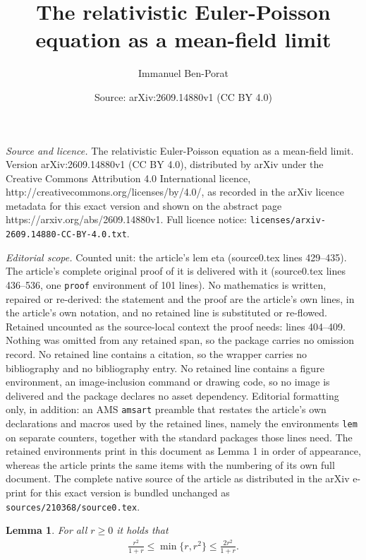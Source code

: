 \documentclass[10pt,a4paper]{amsart}
\title{The relativistic Euler-Poisson equation as a mean-field limit}
\author{Immanuel Ben-Porat}
\date{Source: arXiv:2609.14880v1 (CC BY 4.0)}
\newtheorem{lem}{Lemma}
\begin{document}
\maketitle

\noindent\emph{Source and licence.} The relativistic Euler-Poisson equation as a mean-field limit. Version arXiv:2609.14880v1 (CC BY 4.0), distributed by arXiv under the Creative Commons Attribution 4.0 International licence, http://creativecommons.org/licenses/by/4.0/, as recorded in the arXiv licence metadata for this exact version and shown on the abstract page https://arxiv.org/abs/2609.14880v1. Full licence notice: \texttt{licenses/arxiv-2609.14880-CC-BY-4.0.txt}.\par\smallskip

\noindent\textit{Editorial scope.} Counted unit: the article's lem eta (source0.tex lines 429--435). The article's complete original proof of it is delivered with it (source0.tex lines 436--536, one \texttt{proof} environment of 101 lines). No mathematics is written, repaired or re-derived: the statement and the proof are the article's own lines, in the article's own notation, and no retained line is substituted or re-flowed.  Retained uncounted as the source-local context the proof needs: lines 404--409.  Nothing was omitted from any retained span, so the package carries no omission record.  No retained line contains a citation, so the wrapper carries no bibliography and no bibliography entry.  No retained line contains a figure environment, an image-inclusion command or drawing code, so no image is delivered and the package declares no asset dependency.  Editorial formatting only, in addition: an AMS \texttt{amsart} preamble that restates the article's own declarations and macros used by the retained lines, namely the environments \texttt{lem} on separate counters, together with the standard packages those lines need.  The retained environments print in this document as Lemma 1 in order of appearance, whereas the article prints the same items with the numbering of its own full document.  The complete native source of the article as distributed in the arXiv e-print for this exact version is bundled unchanged as \texttt{sources/210368/source0.tex}.
\begin{lem}\label{elementary ine about min}
For all $r\geq 0$ it holds that 
\begin{align*}
\frac{r^{2}}{1+r}\leq \min\{r,r^{2}\}\leq \frac{2r^{2}}{1+r}.     
\end{align*}
\end{lem}
\end{document}
